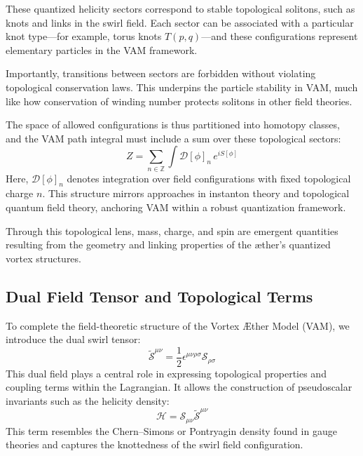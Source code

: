 \documentclass[a4paper,12pt]{article}
\begin{document}
        These quantized helicity sectors correspond to stable topological solitons, such as knots and links in the swirl field. Each sector can be associated with a particular knot type---for example, torus knots $T(p,q)$---and these configurations represent elementary particles in the VAM framework.

        Importantly, transitions between sectors are forbidden without violating topological conservation laws. This underpins the particle stability in VAM, much like how conservation of winding number protects solitons in other field theories.

        The space of allowed configurations is thus partitioned into homotopy classes, and the VAM path integral must include a sum over these topological sectors:
        \begin{equation}
            Z = \sum_{n \in \mathbb{Z}} \int \mathcal{D}[\phi]_n \, e^{i S[\phi]}
        \end{equation}
        Here, $\mathcal{D}[\phi]_n$ denotes integration over field configurations with fixed topological charge $n$. This structure mirrors approaches in instanton theory and topological quantum field theory, anchoring VAM within a robust quantization framework.

        Through this topological lens, mass, charge, and spin are emergent quantities resulting from the geometry and linking properties of the æther's quantized vortex structures.

        \subsection{Dual Field Tensor and Topological Terms}
        To complete the field-theoretic structure of the Vortex Æther Model (VAM), we introduce the dual swirl tensor:
        \begin{equation}
            \tilde{\mathcal{S}}^{\mu\nu} = \frac{1}{2} \epsilon^{\mu\nu\rho\sigma} \mathcal{S}_{\rho\sigma}
        \end{equation}
        This dual field plays a central role in expressing topological properties and coupling terms within the Lagrangian. It allows the construction of pseudoscalar invariants such as the helicity density:
        \begin{equation}
            \mathcal{H} = \mathcal{S}_{\mu\nu} \tilde{\mathcal{S}}^{\mu\nu}
        \end{equation}
        This term resembles the Chern--Simons or Pontryagin density found in gauge theories and captures the knottedness of the swirl field configuration.
\end{document}
